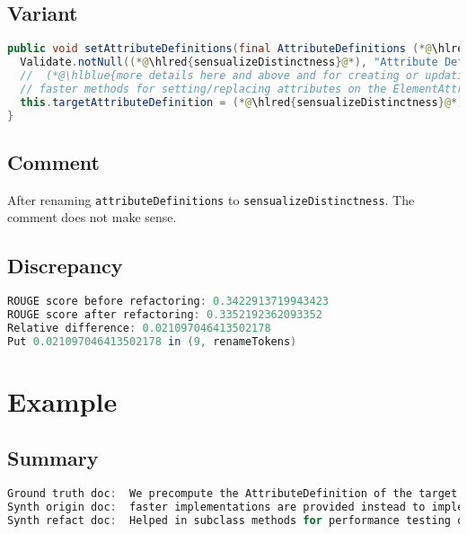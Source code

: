 \documentclass[11pt]{article}
\DeclareRobustCommand{\hlred}[1]{{\sethlcolor{YellowOrange}\hl{#1}}}
\DeclareRobustCommand{\hlblue}[1]{{\sethlcolor{SeaGreen}\hl{#1}}}
\DeclareRobustCommand{\hlblue}[1]{{\sethlcolor{SkyBlue}\hl{#1}}}
\begin{document}
\subsection{Variant}
\begin{lstlisting}[language=java]
public void setAttributeDefinitions(final AttributeDefinitions (*@\hlred{sensualizeDistinctness}@*)) {
  Validate.notNull((*@\hlred{sensualizeDistinctness}@*), "Attribute Definitions cannot be null");
  //  (*@\hlblue{more details here and above and for creating or updating elements are two or fewer than}@*)
  // faster methods for setting/replacing attributes on the ElementAttributes implementation
  this.targetAttributeDefinition = (*@\hlred{sensualizeDistinctness}@*).forName(TEMPLATE_MODE, TARGET_ATTR_NAME);
}
\end{lstlisting}

\subsection{Comment}

After renaming \texttt{attributeDefinitions} to \texttt{sensualizeDistinctness}. The comment does not make sense.

\subsection{Discrepancy}
\begin{lstlisting}[language=java]
ROUGE score before refactoring: 0.3422913719943423
ROUGE score after refactoring: 0.3352192362093352
Relative difference: 0.021097046413502178
Put 0.021097046413502178 in (9, renameTokens)
\end{lstlisting}


\pagebreak
\section{Example}
\subsection{Summary}

\begin{lstlisting}[language=java]
Ground truth doc:  We precompute the AttributeDefinition of the target attribute in order to being able to use much
Synth origin doc:  faster implementations are provided instead to implement additional and more sophisticated or intuitive or useful but
Synth refact doc:  Helped in subclass methods for performance testing or by writing the below comments for adding
\end{lstlisting}
\end{document}

